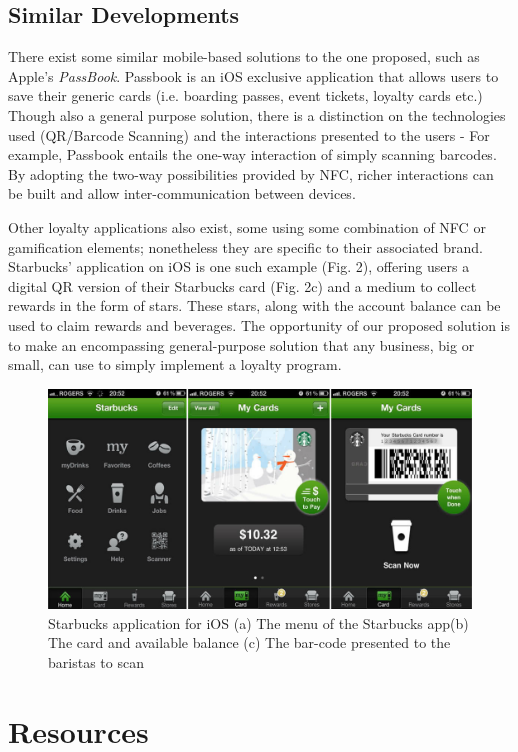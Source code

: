 \subsection{Similar Developments}
There exist some similar mobile-based solutions to the one proposed, such as Apple's \emph{PassBook}. Passbook is an iOS exclusive application that allows users to save their generic cards (i.e. boarding passes, event tickets, loyalty cards etc.) Though also a general purpose solution, there is a distinction on the technologies used (QR/Barcode Scanning) and the interactions presented to the users - For example, Passbook entails the one-way interaction of simply scanning barcodes. By adopting the two-way possibilities provided by NFC, richer interactions can be built and allow inter-communication between devices.

Other loyalty applications also exist, some using some combination of NFC or gamification elements; nonetheless they are specific to their associated brand. Starbucks' application on iOS is one such example (Fig. 2), offering users a digital QR version of their Starbucks card (Fig. 2c) and a medium to collect rewards in the form of stars. These stars, along with the account balance can be used to claim rewards and beverages. The opportunity of our proposed solution is to make an encompassing general-purpose solution that any business, big or small, can use to simply implement a loyalty program.


\begin{figure}[h!]
  \centering
    \includegraphics[width=1\textwidth]{img/starbucks-image-2.jpeg}
      \caption{Starbucks application for iOS (a) The menu of the Starbucks app(b) The card and available balance (c) The bar-code presented to the baristas to scan}
\end{figure}

\section{Resources}

